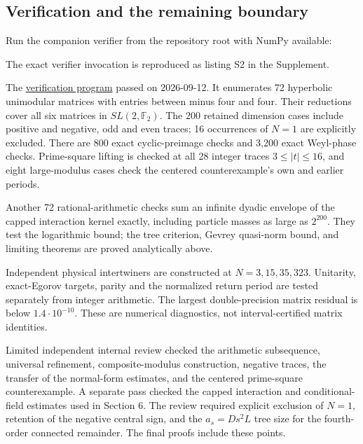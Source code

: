 \hypertarget{verification-and-the-remaining-boundary}{%
\subsection{Verification and the remaining boundary}\label{verification-and-the-remaining-boundary}}

Run the companion verifier from the repository root with NumPy available:

The exact verifier invocation is reproduced as listing S2 in the Supplement.

The \href{https://github.com/ChurilovMaksim/BGS/blob/main/computations/verification/general_cat_return_laws.py}{verification program}
passed on 2026-09-12. It enumerates 72 hyperbolic unimodular matrices
with entries between minus four and four. Their reductions cover all
six matrices in \(SL(2,\mathbb F_2)\). The 200 retained dimension cases
include positive and negative, odd and even traces; 16 occurrences
of \(N=1\) are explicitly excluded.
There are 800 exact cyclic-preimage checks and 3,200 exact Weyl-phase
checks. Prime-square lifting is checked at all 28 integer traces
\(3\le|t|\le16\), and eight large-modulus cases check the centered
counterexample's own and earlier periods.

Another 72 rational-arithmetic checks sum an infinite dyadic envelope
of the capped interaction kernel exactly, including particle masses
as large as \(2^{200}\). They test the logarithmic bound; the tree
criterion, Gevrey quasi-norm bound, and limiting theorems are proved
analytically above.

Independent physical intertwiners are constructed at \(N=3,15,35,323\).
Unitarity, exact-Egorov targets, parity and the normalized return
period are tested separately from integer arithmetic.
The largest double-precision matrix residual is below
\(1.4\cdot10^{-10}\). These are numerical diagnostics, not
interval-certified matrix identities.

Limited independent internal review checked the arithmetic
subsequence, universal refinement, composite-modulus construction,
negative traces, the transfer of the normal-form estimates, and
the centered prime-square counterexample. A separate pass checked
the capped interaction and conditional-field estimates used in
Section 6. The review required explicit exclusion of \(N=1\),
retention of the negative central sign, and the
\(a_s=D s^2L\) tree size for the fourth-order connected remainder.
The final proofs include these points.

